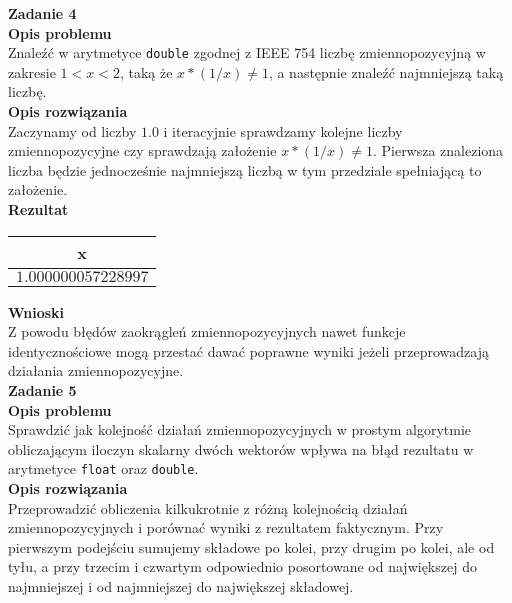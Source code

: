 \documentclass{article}
\begin{document}
\pagebreak

\noindent \textbf{Zadanie 4} \\[\baselineskip]
\noindent \textbf{Opis problemu} \\
Znaleźć w arytmetyce \texttt{double} zgodnej z IEEE 754 liczbę zmiennopozycyjną
w zakresie $1 < x < 2$, taką że $x*(1/x) \neq 1$, a następnie znaleźć najmniejszą
taką liczbę. \\

\noindent \textbf{Opis rozwiązania} \\
Zaczynamy od liczby $1.0$ i iteracyjnie sprawdzamy kolejne liczby zmiennopozycyjne
czy sprawdzają założenie $x*(1/x) \neq 1$. Pierwsza znaleziona liczba będzie
jednocześnie najmniejszą liczbą w tym przedziale spełniającą to założenie. \\

\noindent \textbf{Rezultat} \\
\begin{center}
\begin{tabular}{|c|}
    \hline
    \textbf{x} \\
    \hline
    $1.000000057228997$ \\ 
    \hline
\end{tabular}
\end{center}

\noindent \textbf{Wnioski} \\
Z powodu błędów zaokrągleń zmiennopozycyjnych nawet funkcje identycznościowe mogą
przestać dawać poprawne wyniki jeżeli przeprowadzają działania zmiennopozycyjne. \\

\noindent \textbf{Zadanie 5} \\[\baselineskip]
\noindent \textbf{Opis problemu} \\
Sprawdzić jak kolejność działań zmiennopozycyjnych w prostym algorytmie obliczającym iloczyn
skalarny dwóch wektorów wpływa na błąd rezultatu w arytmetyce \texttt{float} oraz \texttt{double}. \\

\noindent \textbf{Opis rozwiązania} \\
Przeprowadzić obliczenia kilkukrotnie z różną kolejnością działań zmiennopozycyjnych
i porównać wyniki z rezultatem faktycznym. Przy pierwszym podejściu sumujemy składowe
po kolei, przy drugim po kolei, ale od tyłu, a przy trzecim i czwartym odpowiednio posortowane
od największej do najmniejszej i od najmniejszej do największej składowej. \\
\end{document}

